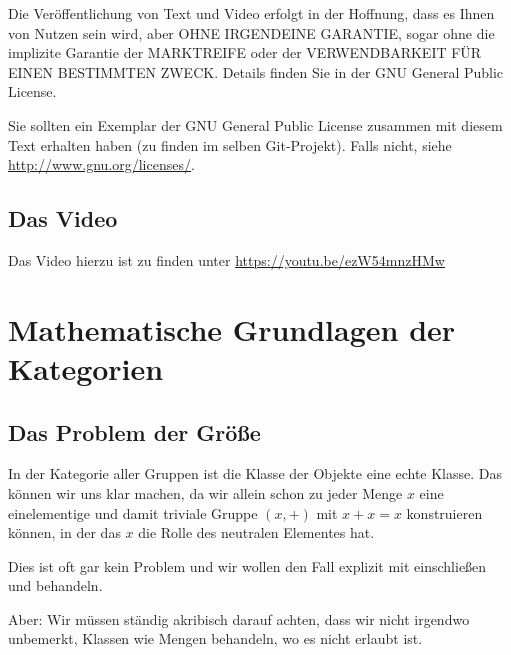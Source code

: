 \documentclass[a4paper]{amsart}
\theoremstyle{definition}
\begin{document}
Die Veröffentlichung von Text und Video erfolgt in der Hoffnung, dass es Ihnen von Nutzen sein wird,
aber OHNE IRGENDEINE GARANTIE, sogar ohne die implizite Garantie der MARKTREIFE oder der
VERWENDBARKEIT FÜR EINEN BESTIMMTEN ZWECK. Details finden Sie in der GNU General Public License.

Sie sollten ein Exemplar der GNU General Public License zusammen mit diesem Text erhalten haben
(zu finden im selben Git-Projekt).
Falls nicht, siehe \url{http://www.gnu.org/licenses/}.

\subsection*{Das Video}
Das Video hierzu ist zu finden unter
{\tiny
   \url{https://youtu.be/ezW54mnzHMw}
}

\section{Mathematische Grundlagen der Kategorien}

\subsection{Das Problem der Größe}
In der Kategorie aller Gruppen ist die Klasse der Objekte eine echte Klasse. Das können wir uns klar machen, da wir allein schon zu jeder Menge $x$ eine einelementige und damit triviale Gruppe $( {x}, +)$ mit $x + x = x$ konstruieren können, in der das $x$ die Rolle des neutralen Elementes hat.

Dies ist oft gar kein Problem und wir wollen den Fall explizit mit einschließen und behandeln.

Aber: Wir müssen ständig akribisch darauf achten, dass wir nicht irgendwo unbemerkt, Klassen wie Mengen behandeln, wo es nicht erlaubt ist.
\end{document}
